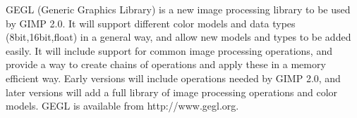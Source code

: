 GEGL (Generic Graphics Library) is a new image processing library to be used by
GIMP 2.0. It will support different color models and data types
(8bit,16bit,float) in a general way, and allow new models and types to be added
easily.  It will include support for common image processing operations, and
provide a way to create chains of operations and apply these in a memory
efficient way.  Early versions will include operations needed by GIMP 2.0, and
later versions will add a full library of image processing operations and color
models. GEGL is available from http://www.gegl.org.
